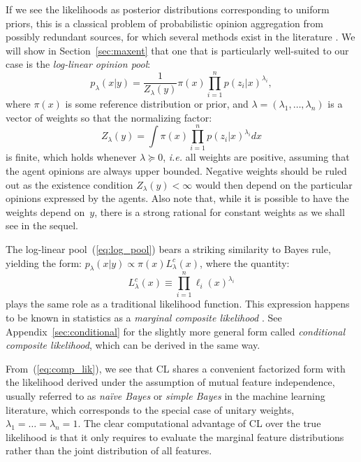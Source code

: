 \documentclass[english]{scrartcl}
\begin{document}
If we see the likelihoods as posterior distributions corresponding to uniform priors, this is a classical problem of probabilistic opinion aggregation from possibly redundant sources, for which several methods exist in the literature \cite{Tarantola-82,Genest-86,Garg-04,Allard-12}. We will show in Section~\ref{sec:maxent} that one that is particularly well-suited to our case is the {\em log-linear opinion pool}: 
\begin{equation}
\label{eq:log_pool}
p_\lambda(x|y) = \frac{1}{Z_\lambda(y)} \pi(x) \prod_{i=1}^n p(z_i|x)^{\lambda_i},
\end{equation} 
where $\pi(x)$ is some reference distribution or prior, and $\lambda=(\lambda_1,\ldots,\lambda_n)$ is a vector of weights so that the normalizing factor:
$$
Z_\lambda(y) = \int \pi(x) \prod_{i=1}^n p(z_i|x)^{\lambda_i} dx
$$
is finite, which holds whenever $\lambda\succeq 0$, {\em i.e.} all weights are positive, assuming that the agent opinions are always upper bounded. Negative weights should be ruled out as the existence condition $Z_\lambda(y)<\infty$ would then depend on the particular opinions expressed by the agents. Also note that, while it is possible to have the weights depend on~$y$, there is a strong rational for constant weights as we shall see in the sequel. 



The log-linear pool~(\ref{eq:log_pool}) bears a striking similarity to Bayes rule, yielding the form: $p_\lambda(x|y)\propto \pi(x) L^c_\lambda(x)$, where the quantity:
\begin{equation}
\label{eq:comp_lik}
L^c_\lambda(x) \equiv \prod_{i=1}^n \ell_i (x)^{\lambda_i}
\end{equation} 
plays the same role as a traditional likelihood function. This expression happens to be known in statistics as a {\em marginal composite likelihood} \cite{Varin-11}. See Appendix~\ref{sec:conditional} for the slightly more general form called {\em conditional composite likelihood}, which can be derived in the same way.

From~(\ref{eq:comp_lik}), we see that CL shares a convenient factorized form with the likelihood derived under the assumption of mutual feature independence, usually referred to as {\em na\"ive Bayes} or {\em simple Bayes} in the machine learning literature, which corresponds to the special case of unitary weights, $\lambda_1=\ldots=\lambda_n= 1$. The clear computational advantage of CL over the true likelihood is that it only requires to evaluate the marginal feature distributions rather than the joint distribution of all features.
\end{document}
